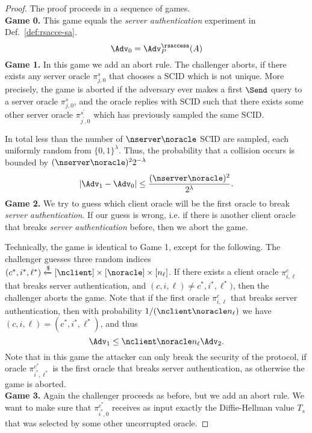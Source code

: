 \begin{proof}
 The proof proceeds in a sequence of games. \vspace{10pt}\\
 {\bfseries Game 0.} This game equals the \textit{server authentication} experiment in Def.~\ref{def:rsacce-sa}.\\
 \begin{equation}
  \Adv_0 = \Adv^{\rsaccesa}_{P}(A)
 \end{equation}%
%
%
 \textbf{Game 1.} In this game we add an abort rule.
 The challenger aborts, if there exists any server oracle $\pi^s_{j, 0}$
  that chooses a SCID which is not unique.
 More precisely, the game is aborted if the adversary ever makes a first $\Send$ query to a server oracle $\pi^s_{j, 0}$, and the oracle replies with SCID such that there exists some other server oracle $\pi^{s^{\prime}}_{j^{\prime}, 0}$ which has previously sampled the same SCID.

 In total less than the number of $\nserver \noracle$ SCID are sampled, each uniformly random from $\{0,1\}^{\lambda}$.
 Thus, the probability that a collision occurs is bounded by $(\nserver \noracle)^2 2^{-\lambda}$
 \begin{equation}
  |\Adv_1 - \Adv_0| \leq \frac{(\nserver \noracle)^2}{2^{\lambda}}.
 \end{equation}%
%
%
 \textbf{Game 2.} We try to guess which client oracle will be the first oracle to break \textit{server authentication}. If our guess is wrong, i.e. if there is another client oracle that breaks \textit{server authentication} before, then we abort the game.

 Technically, the game is identical to Game 1, except for the following. The challenger guesses three random indices $(c^{\ast}, i^{\ast}, \ell^{\ast}) \xleftarrow{\$} [\nclient] \times [\noracle] \times [n_{\ell}]$. If there exists a client oracle $\pi^c_{i,\ell}$ that breaks server authentication, and $(c, i, \ell) \neq c^{\ast}, i^{\ast}, \ell^{\ast})$, then the challenger aborts the game. Note that if the first oracle $\pi^c_{i,\ell}$ that breaks server authentication, then with probability $1/(\nclient \noracle n_{\ell})$ we have $(c,i,\ell) = (c^{\ast}, i^{\ast}, \ell^{\ast})$, and thus
 \begin{equation}
  \Adv_1 \leq \nclient \noracle n_{\ell} \Adv_2.
 \end{equation}%
 Note that in this game the attacker can only break the security of the protocol, if oracle $\pi^{c^{\ast}}_{i^{\ast},\ell^{\ast}}$ is the first oracle that breaks server authentication, as otherwise the game is aborted.
\vspace{10pt}\\%
%
%
 \textbf{Game 3.} Again the challenger proceeds as before, but we add an abort rule. We want to make sure that $\pi^{c^\ast}_{i^{\ast},0}$ receives as input exactly the Diffie-Hellman value $T_s$ that was selected by some other uncorrupted oracle.


\end{proof}
